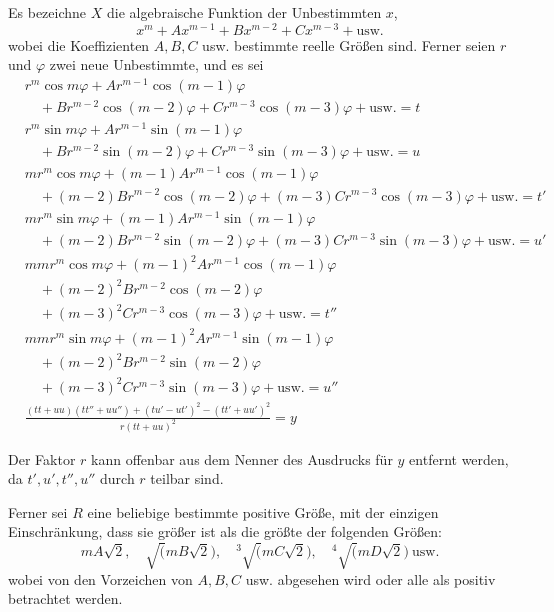 Es bezeichne $X$ die algebraische Funktion der Unbestimmten $x$,
\[
x^m+Ax^{m-1}+Bx^{m-2}+Cx^{m-3}+\mathrm{usw.}
\]
wobei die Koeffizienten $A,B,C$ usw. bestimmte reelle Größen sind. Ferner seien $r$ und $\varphi$ zwei neue Unbestimmte, und es sei
\[
\begin{aligned}
&r^m\cos m\varphi+Ar^{m-1}\cos(m-1)\varphi
\\
&\quad+Br^{m-2}\cos(m-2)\varphi+Cr^{m-3}\cos(m-3)\varphi
+\mathrm{usw.}=t\\
&r^m\sin m\varphi+Ar^{m-1}\sin(m-1)\varphi
\\
&\quad+Br^{m-2}\sin(m-2)\varphi+Cr^{m-3}\sin(m-3)\varphi
+\mathrm{usw.}=u\\
&mr^m\cos m\varphi+(m-1)Ar^{m-1}\cos(m-1)\varphi
\\
&\quad+(m-2)Br^{m-2}\cos(m-2)\varphi+(m-3)Cr^{m-3}\cos(m-3)\varphi
+\mathrm{usw.}=t'\\
&mr^m\sin m\varphi+(m-1)Ar^{m-1}\sin(m-1)\varphi
\\
&\quad+(m-2)Br^{m-2}\sin(m-2)\varphi+(m-3)Cr^{m-3}\sin(m-3)\varphi
+\mathrm{usw.}=u'\\
&mmr^m\cos m\varphi+(m-1)^2Ar^{m-1}\cos(m-1)\varphi
\\
&\quad+(m-2)^2Br^{m-2}\cos(m-2)\varphi\\
&\quad+(m-3)^2Cr^{m-3}\cos(m-3)\varphi
+\mathrm{usw.}=t''\\
&mmr^m\sin m\varphi+(m-1)^2Ar^{m-1}\sin(m-1)\varphi
\\
&\quad+(m-2)^2Br^{m-2}\sin(m-2)\varphi\\
&\quad+(m-3)^2Cr^{m-3}\sin(m-3)\varphi
+\mathrm{usw.}=u''\\
&\frac{(tt+uu)(tt''+uu'')+(tu'-ut')^2-(tt'+uu')^2}
{r(tt+uu)^2}=y
\end{aligned}
\]

Der Faktor $r$ kann offenbar aus dem Nenner des Ausdrucks für $y$ entfernt werden, da $t',u',t'',u''$ durch $r$ teilbar sind.

Ferner sei $R$ eine beliebige bestimmte positive Größe, mit der einzigen Einschränkung, dass sie größer ist als die größte der folgenden Größen:
\[
mA\surd2,\quad\surd(mB\surd2),\quad
{}^3\!\surd(mC\surd2),\quad{}^4\!\surd(mD\surd2)\ \mathrm{usw.}
\]
wobei von den Vorzeichen von $A,B,C$ usw. abgesehen wird oder alle als positiv betrachtet werden.

